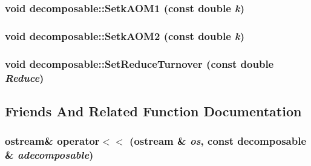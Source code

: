 \label{classdecomposable_a9df0927068758ebb7dc75375b241c14f}
\hypertarget{classdecomposable_a8c680d41f48b8e14d9f127f0b771836a}{
\subsubsection[{SetkAOM1}]{\setlength{\rightskip}{0pt plus 5cm}void decomposable::SetkAOM1 (const double {\em k})}}
\label{classdecomposable_a8c680d41f48b8e14d9f127f0b771836a}
\hypertarget{classdecomposable_a280ab626bd4466f525db92da5018a4ff}{
\subsubsection[{SetkAOM2}]{\setlength{\rightskip}{0pt plus 5cm}void decomposable::SetkAOM2 (const double {\em k})}}
\label{classdecomposable_a280ab626bd4466f525db92da5018a4ff}
\hypertarget{classdecomposable_af4673c697be4a074bd8e18375cbf5ef8}{
\subsubsection[{SetReduceTurnover}]{\setlength{\rightskip}{0pt plus 5cm}void decomposable::SetReduceTurnover (const double {\em Reduce})}}
\label{classdecomposable_af4673c697be4a074bd8e18375cbf5ef8}


\subsection{Friends And Related Function Documentation}
\hypertarget{classdecomposable_a44e65cd8ff15e859dba4d1bfd1003c98}{
\subsubsection[{operator$<$$<$}]{\setlength{\rightskip}{0pt plus 5cm}ostream\& operator$<$$<$ (ostream \& {\em os}, \/  const {\bf decomposable} \& {\em adecomposable})}}
\label{classdecomposable_a44e65cd8ff15e859dba4d1bfd1003c98}


